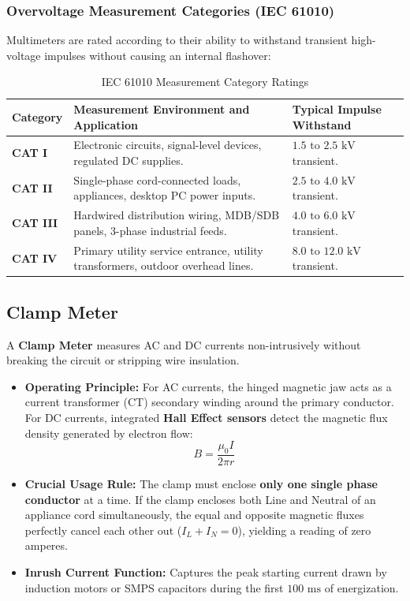 \subsubsection{Overvoltage Measurement Categories (IEC 61010)}
Multimeters are rated according to their ability to withstand transient high-voltage impulses without causing an internal flashover:
\begin{table}[H]
\centering
\small
{}
\begin{tabularx}{\linewidth}{l X l}
\toprule
\rowcolor{tableheadercolor}
\textbf{Category} & \textbf{Measurement Environment and Application} & \textbf{Typical Impulse Withstand} \\
\midrule
\textbf{CAT I} & Electronic circuits, signal-level devices, regulated DC supplies. & $1.5\text{ to }2.5\text{ kV}$ transient. \\
\textbf{CAT II} & Single-phase cord-connected loads, appliances, desktop PC power inputs. & $2.5\text{ to }4.0\text{ kV}$ transient. \\
\textbf{CAT III} & Hardwired distribution wiring, MDB/SDB panels, 3-phase industrial feeds. & $4.0\text{ to }6.0\text{ kV}$ transient. \\
\textbf{CAT IV} & Primary utility service entrance, utility transformers, outdoor overhead lines. & $8.0\text{ to }12.0\text{ kV}$ transient. \\
\bottomrule
\end{tabularx}
\caption{IEC 61010 Measurement Category Ratings}
\end{table}

\subsection{Clamp Meter}
A \textbf{Clamp Meter} measures AC and DC currents non-intrusively without breaking the circuit or stripping wire insulation.
\begin{itemize}[leftmargin=*]
    \item \textbf{Operating Principle:} For AC currents, the hinged magnetic jaw acts as a current transformer (CT) secondary winding around the primary conductor. For DC currents, integrated \textbf{Hall Effect sensors} detect the magnetic flux density generated by electron flow:
    \[
    B = \frac{\mu_0 I}{2\pi r}
    \]
    \item \textbf{Crucial Usage Rule:} The clamp must enclose \textbf{only one single phase conductor} at a time. If the clamp encloses both Line and Neutral of an appliance cord simultaneously, the equal and opposite magnetic fluxes perfectly cancel each other out ($I_L + I_N = 0$), yielding a reading of zero amperes.
    \item \textbf{Inrush Current Function:} Captures the peak starting current drawn by induction motors or SMPS capacitors during the first $100\text{ ms}$ of energization.
\end{itemize}

